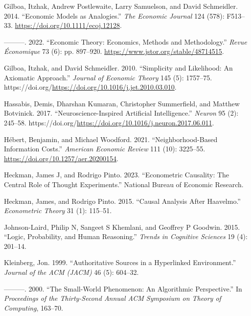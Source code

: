 \documentclass[
]{article}
\newlength{\cslhangindent}
\newenvironment{CSLReferences}[2] %
 {\begin{list}{}{%
  \setlength{\itemindent}{0pt}
  \setlength{\leftmargin}{0pt}
  \setlength{\parsep}{0pt}
  \ifodd #1
   \setlength{\leftmargin}{\cslhangindent}
   \setlength{\itemindent}{-1\cslhangindent}
  \fi
  \setlength{\itemsep}{#2\baselineskip}}}
 {\end{list}}
\begin{document}
\begin{CSLReferences}{1}{0}
Gilboa, Itzhak, Andrew Postlewaite, Larry Samuelson, and David
Schmeidler. 2014. {``{Economic Models as Analogies}.''} \emph{The
Economic Journal} 124 (578): F513--33.
\url{https://doi.org/10.1111/ecoj.12128}.

---------. 2022. {``Economic Theory: Economics, Methods and
Methodology.''} \emph{Revue Économique} 73 (6): pp. 897--920.
\url{https://www.jstor.org/stable/48714515}.

Gilboa, Itzhak, and David Schmeidler. 2010. {``Simplicity and
Likelihood: An Axiomatic Approach.''} \emph{Journal of Economic Theory}
145 (5): 1757--75.
https://doi.org/\url{https://doi.org/10.1016/j.jet.2010.03.010}.

Hassabis, Demis, Dharshan Kumaran, Christopher Summerfield, and Matthew
Botvinick. 2017. {``Neuroscience-Inspired Artificial Intelligence.''}
\emph{Neuron} 95 (2): 245--58.
https://doi.org/\url{https://doi.org/10.1016/j.neuron.2017.06.011}.

Hébert, Benjamin, and Michael Woodford. 2021. {``Neighborhood-Based
Information Costs.''} \emph{American Economic Review} 111 (10):
3225--55. \url{https://doi.org/10.1257/aer.20200154}.

Heckman, James J, and Rodrigo Pinto. 2023. {``Econometric Causality: The
Central Role of Thought Experiments.''} National Bureau of Economic
Research.

Heckman, James, and Rodrigo Pinto. 2015. {``Causal Analysis After
Haavelmo.''} \emph{Econometric Theory} 31 (1): 115--51.

Johnson-Laird, Philip N, Sangeet S Khemlani, and Geoffrey P Goodwin.
2015. {``Logic, Probability, and Human Reasoning.''} \emph{Trends in
Cognitive Sciences} 19 (4): 201--14.

Kleinberg, Jon. 1999. {``Authoritative Sources in a Hyperlinked
Environment.''} \emph{Journal of the ACM (JACM)} 46 (5): 604--32.

---------. 2000. {``The Small-World Phenomenon: An Algorithmic
Perspective.''} In \emph{Proceedings of the Thirty-Second Annual ACM
Symposium on Theory of Computing}, 163--70.


\end{CSLReferences}
\end{document}
